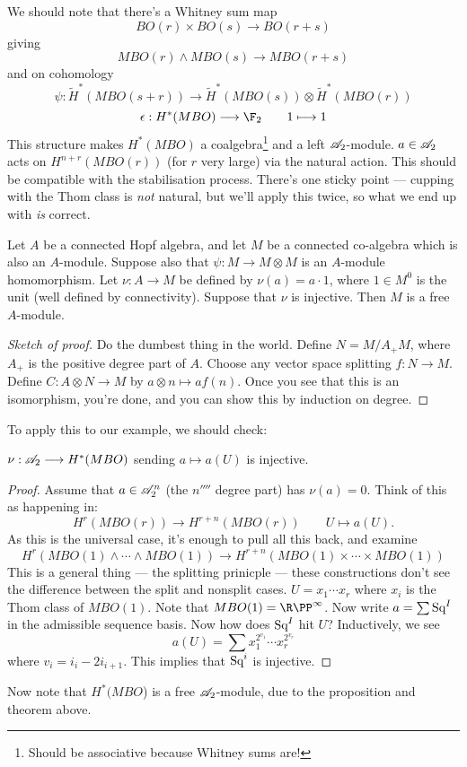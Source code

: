 \documentclass[11pt]{article}
\begin{document}
\begin{JeremyThomTalk}
We should note that there's a Whitney sum map 
\[BO(r)\times BO(s)\to BO(r+s)\]
giving
\[MBO(r)\wedge MBO(s)\to MBO(r+s)\]
and on cohomology
\[\psi:\widetilde H^* (MBO(s+r))\to \widetilde H^*( MBO(s))\otimes \widetilde H^* (MBO(r))\]
\[\epsilon: H^*(MBO)\to\F_2\qquad 1\mapsto 1\]
This structure makes $H^*(MBO)$ a coalgebra\footnote{Should be associative because Whitney sums are!} and a left $\mathscr{A}_2$-module. $a\in\mathscr{A}_2$ acts on $H^{n+r}(MBO(r))$ (for $r$ very large) via the natural action. This should be compatible with the stabilisation process. There's one sticky point --- cupping with the Thom class is \emph{not} natural, but we'll apply this twice, so what we end up with \emph{is} correct.
\begin{thm*}
Let $A$ be a connected Hopf algebra, and let $M$ be a connected co-algebra which is also an $A$-module. Suppose also that $\psi:M\to M\otimes M$ is an $A$-module homomorphism. Let $\nu:A\to M$ be defined by $\nu(a)=a\cdot1$, where $1\in M^0$ is the unit (well defined by connectivity). Suppose that $\nu$ is injective. Then $M$ is a free $A$-module.
\end{thm*}
\begin{proof}[Sketch of proof]
Do the dumbest thing in the world. Define $N=M/A_+M$, where $A_+$ is the positive degree part of $A$. Choose any vector space splitting $f:N\to M$. Define $C:A\otimes N\to M$ by $a\otimes n\mapsto af(n)$. Once you see that this is an isomorphism, you're done, and you can show this by induction on degree.
\end{proof}
\noindent To apply this to our example, we should check:
\begin{prop*}
$\nu:\mathscr{A}_2\longrightarrow H^*(MBO)$ sending $a\mapsto a(U)$ is injective.
\end{prop*}
\begin{proof}
Assume that $a\in\mathscr{A}_2^n$ (the $n\fourth$ degree part) has $\nu(a)=0$. Think of this as happening in:
\[H^r(MBO(r))\to H^{r+n}(MBO(r))\qquad U\mapsto a(U).\]
As this is the universal case, it's enough to pull all this back, and examine
\[H^r(MBO(1)\wedge\cdots\wedge MBO(1))\to H^{r+n}(MBO(1)\times\cdots\times MBO(1))\]
This is a general thing --- the splitting prinicple --- these constructions don't see the difference between the split and nonsplit cases. $U=x_1\cdots x_r$ where $x_i$ is the Thom class of $MBO(1)$. Note that $MBO(1)=\RP^\infty$. Now write $a=\sum \textup{Sq}^I$ in the admissible sequence basis. Now how does $\textup{Sq}^I$ hit $U$? Inductively, we see
\[a(U)=\sum x_1^{2^{v_1}}\cdots x_r^{2^{v_r}}\]
where $v_i=i_i-2i_{i+1}$. This implies that $\textup{Sq}^i$ is injective.
\end{proof}
 Now note that $H^*(MBO$) is a free $\mathscr{A}_2$-module, due to the proposition and theorem above.

\end{JeremyThomTalk}
\end{document}
